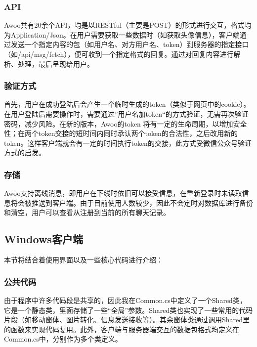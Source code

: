 \documentclass[a4paper,11pt]{article}
\begin{document}
        \subsubsection{API}
            Awoo共有20余个API，均是以RESTful（主要是POST）的形式进行交互，格式均为Application/Json。在用户需要获取一些数据时（如获取头像信息），客户端通过发送一个指定内容的包（如用户名、对方用户名、token）到服务器的指定接口（如/api/msg/fetch），便可收到一个指定格式的回复。通过对回复内容进行解析、处理，最后呈现给用户。
        \subsubsection{验证方式}
            首先，用户在成功登陆后会产生一个临时生成的token（类似于网页中的cookie）。在用户登陆后需要操作时，需要通过”用户名加token“的方式验证，无需再次验证密码，减少风险。在新的版本，Awoo的token 将有一定的生命周期，以增加安全性；在两个token交接的短时间内同时承认两个token的合法性，之后改用新的token。这样客户端就会有一定的时间执行token的交接，此方式受微信公众号验证方式的启发\textsuperscript{\cite{4}}。
        \subsubsection{存储}
            Awoo支持离线消息，即用户在下线时依旧可以接受信息，在重新登录时未读取信息将会被推送到客户端。由于目前使用人数较少，因此不会定时对数据库进行备份和清空，用户可以查看从注册到当前的所有聊天记录。

    \subsection{Windows客户端}
        本节将结合着使用界面以及一些核心代码进行介绍：
        \subsubsection{公共代码}
            由于程序中许多代码段是共享的，因此我在Common.cs中定义了一个Shared类，它是一个静态类，里面存储了一些“全局”参数。Shared类也实现了一些常用的代码片段（如移动窗体、图片转化、信息发送接收等）。其余窗体类通过调用Shared里的函数来实现代码复用。此外，客户端与服务器端交互的数据包格式均定义在Common.cs中，分别作为多个类定义。
\end{document}
